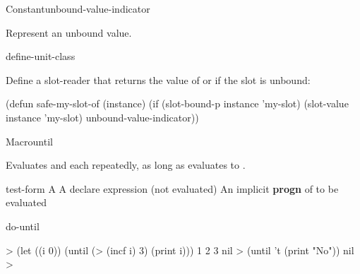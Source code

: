 \documentclass[10pt,twoside,english,pdftex]{article}
\begin{document}

\begin{functiondoc}{Constant}{unbound-value-indicator}{}%

\fnsyntax

\fnpurpose Represent an unbound value.

\fnpackage {}

\fnmodule {}

\begin{alsos}{define-unit-class}
\end{alsos}

\fnexample Define a slot-reader  that returns the value of
 or  if the slot
is unbound:
%
\W\supp
\begin{example}
  (defun safe-my-slot-of (instance)
    (if (slot-bound-p instance 'my-slot)
        (slot-value instance 'my-slot)
        unbound-value-indicator))
\end{example}

\end{functiondoc}


\begin{functiondoc}{Macro}{until}{ 
    \superstar{}
    \superstar}
%
  
\fnsyntax

\fnpurpose Evaluates  and each  repeatedly,
as long as  evaluates to \nil.

\fnpackage {}

\fnmodule {}

\fnargs
\begin{args}{test-form}
 A 
\arg[declaration] A declare expression (not evaluated)
\arg[forms] An implicit \textbf{progn} of  to be evaluated
\end{args}

\begin{alsos}{do-until}
\also[do-until]
\also[while]
\end{alsos}

\fnexamples
%
\W\supp
\begin{example}
  > (let ((i 0)) 
      (until (> (incf i) 3) 
         (print i)))
  1 
  2 
  3 
  nil\goodpagebreak
  > (until 't (print "No"))
  nil
  >
\end{example}

\end{functiondoc}
\end{document}
